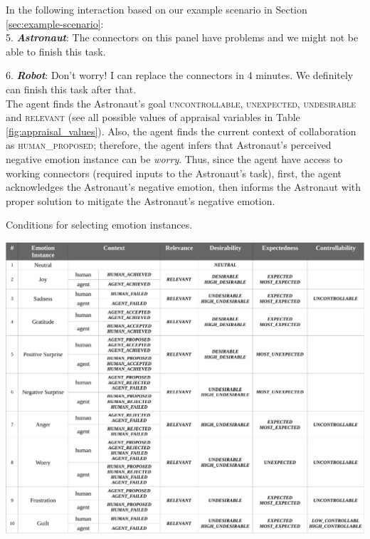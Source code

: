 \documentclass[12pt]{report}
\begin{document}
{\color{red} In the following interaction based on our example scenario in
Section \ref{sec:example-scenario}:\\

  5. \textbf{\textit{Astronaut}}: The connectors on this panel have problems and
  we might not be able to finish this task.

  6. \textbf{\textit{Robot}}: Don't worry! I can replace the connectors in 4
  minutes. We definitely can finish this task after that.\\

The agent finds the Astronaut's goal \textsc{uncontrollable},
\textsc{unexpected}, \textsc{undesirable} and \textsc{relevant} (see all
possible values of appraisal variables in Table \ref{fig:appraisal_values}).
Also, the agent finds the current context of collaboration as
\textsc{human\_proposed}; therefore, the agent infers that Astronaut's
perceived negative emotion instance can be \textit{worry}. Thus, since the agent
have access to working connectors (required inputs to the Astronaut's task),
first, the agent acknowledges the Astronaut's negative emotion, then informs
the Astronaut with proper solution to mitigate the Astronaut's negative
emotion.}


\begin{table}
  \centering
  \caption{Conditions for selecting emotion instances.}
  \label{fig:emotion_elicitation}
  \includegraphics[width=1\textwidth]{figure/emotion_elicitation_croped.pdf}
\end{table}
\end{document}
